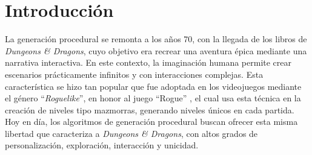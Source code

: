 \documentclass[letter, 10pt]{article}
\begin{document}
\begin{abstract}

Los juegos han acompa\~nado a la humanidad desde sus inicios como herramientas de socializaci\'on, entretenimiento y, m\'as importante a\'un, como catalizadores de creatividad y tecnolog\'ia. Podemos observar c\'omo la industria de los juegos y la tecnolog\'ia avanzan a pasos agigantados, reflejado en la creciente inversi\'on y ganancias en este sector, as\'i como en los avances en \'areas como la computaci\'on cu\'antica, la rob\'otica, la inteligencia artificial y el desarrollo de algoritmos. T\'ecnicas como la generaci\'on procedural de mazmorras, fundamentales en el dise\~no de videojuegos, permiten la creaci\'on de entornos din\'amicos, personalizables y \'unicos en cada partida. Al reducir la carga de dise\~no manual, estos algoritmos permiten a los desarrolladores centrarse en otros aspectos del juego, como la narrativa y la mec\'anica, fomentando as\'i la innovaci\'on de nuevos conocimientos y tecnolog\'ias.
\end{abstract}

\section{Introducci\'on}

La generaci\'on procedural se remonta a los a\~nos 70, con la llegada de los libros de {\it Dungeons \& Dragons}, cuyo objetivo era recrear una aventura \'epica mediante una narrativa interactiva. En este contexto, la imaginaci\'on humana permite crear escenarios pr\'acticamente infinitos y con interacciones complejas. Esta caracter\'istica se hizo tan popular que fue adoptada en los videojuegos mediante el g\'enero ``{\it Roguelike}'', en honor al juego ``Rogue'' \cite{roguerise}, el cual usa esta t\'ecnica en la creaci\'on de niveles tipo mazmorras, generando niveles \'unicos en cada partida. Hoy en d\'ia, los algoritmos de generaci\'on procedural buscan ofrecer esta misma libertad que caracteriza a {\it Dungeons \& Dragons}, con altos grados de personalizaci\'on, exploraci\'on, interacci\'on y unicidad.
\end{document}

